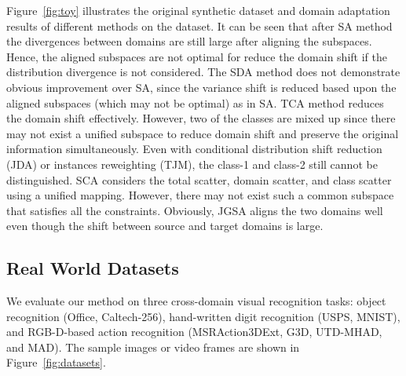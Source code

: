 \documentclass[10pt,twocolumn,letterpaper]{article}
\begin{document}
Figure~\ref{fig:toy} illustrates the original synthetic dataset and domain adaptation results of different methods on the dataset. It can be seen that after SA method the divergences between domains are still large after aligning the subspaces. Hence, the aligned subspaces are not optimal for reduce the domain shift if the distribution divergence is not considered. The SDA method does not demonstrate obvious improvement over SA, since the variance shift is reduced based upon the aligned subspaces (which may not be optimal) as in SA. TCA method reduces the domain shift effectively. However, two of the classes are mixed up since there may not exist a unified subspace to reduce domain shift and preserve the original information simultaneously. Even with conditional distribution shift reduction (JDA) or instances reweighting (TJM), the class-1 and class-2 still cannot be distinguished. SCA considers the total scatter, domain scatter, and class scatter using a unified mapping. However, there may not exist such a common subspace that satisfies all the constraints.
Obviously, JGSA aligns the two domains well even though the shift between source and target domains is large.

\subsection{Real World Datasets}
We evaluate our method on three cross-domain visual recognition tasks: object recognition (Office, Caltech-256), hand-written digit recognition (USPS, MNIST), and RGB-D-based action recognition (MSRAction3DExt, G3D, UTD-MHAD, and MAD). The sample images or video frames are shown in Figure~\ref{fig:datasets}. 
\end{document}
